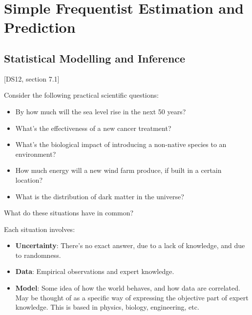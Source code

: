 \documentclass[a4paper]{article}
\begin{document}
    \newpage
    \section{Simple Frequentist Estimation and Prediction}
        \subsection{Statistical Modelling and Inference}
            \begin{fread}
                [MR03, section 7.1]

                [DS12, section 7.1]
            \end{fread}

            Consider the following practical scientific questions:

            \begin{itemize}
                \item By how much will the sea level rise in the next 50 years?
                \item What's the effectiveness of a new cancer treatment?
                \item What's the biological impact of introducing a non-native
                    species to an environment?
                \item How much energy will a new wind farm produce, if built in
                    a certain location?
                \item What is the distribution of dark matter in the universe?
            \end{itemize}

            What do these situations have in common?

            \begin{definition}
                Each situation involves:

                \begin{itemize}
                    \item \textbf{Uncertainty}: There's no exact answer, due to
                        a lack of knowledge, and due to randomness.
                    \item \textbf{Data}: Empirical observations and expert
                        knowledge.
                    \item \textbf{Model}: Some idea of how the world behaves,
                        and how data are correlated. May be thought of as a
                        specific way of expressing the objective part of expert
                        knowledge. This is based in physics, biology,
                        engineering, etc.
                \end{itemize}
            \end{definition}
\end{document}
